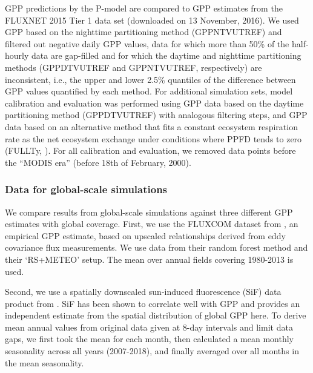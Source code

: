 \documentclass[gmd, manuscript]{copernicus}
\begin{document}
\label{sec:datafiltering}
GPP predictions by the P-model are compared to GPP estimates from the FLUXNET 2015 Tier 1 data set (downloaded on 13 November, 2016). We used GPP based on the nighttime partitioning method \citep{Reichstein2005-mp} (GPP\textunderscore NT\textunderscore VUT\textunderscore REF) and filtered out negative daily GPP values, data for which more than 50\% of the half-hourly data are gap-filled and for which the daytime and nighttime partitioning methods (GPP\textunderscore DT\textunderscore VUT\textunderscore REF and GPP\textunderscore NT\textunderscore VUT\textunderscore REF, respectively) are inconsistent, i.e., the upper and lower 2.5\% quantiles of the difference between GPP values quantified by each method. For additional simulation sets, model calibration and evaluation was performed using GPP data based on the daytime partitioning method (GPP\textunderscore DT\textunderscore VUT\textunderscore REF) \citep{lasslop10} with analogous filtering steps, and GPP data based on an alternative method that fits a constant ecosystem respiration rate as the net ecosystem exchange under conditions where PPFD tends to zero (FULL\textunderscore Ty, \citet{wang17natpl}). For all calibration and evaluation, we removed data points before the ``MODIS era'' (before 18th of February, 2000).


\subsubsection{Data for global-scale simulations}
\label{sec:global_gpp_data}
We compare results from global-scale simulations against three different GPP estimates with global coverage. First, we use the FLUXCOM dataset from \citet{tramontana16bg}, an empirical GPP estimate, based on upscaled relationships derived from eddy covariance flux measurements. We use data from their random forest method and their `RS+METEO' setup. The mean over annual fields covering 1980-2013 is used. 

Second, we use a spatially downscaled sun-induced fluorescence (SiF) data product from \citet{duveiller19essd}. SiF has been shown to correlate well with GPP \citep{frankenberg11grl, guanter14pnas} and provides an independent estimate from the spatial distribution of global GPP here. To derive mean annual values from original data given at 8-day intervals and limit data gaps, we first took the mean for each month, then calculated a mean monthly seasonality across all years (2007-2018), and finally averaged over all months in the mean seasonality.
\end{document}
